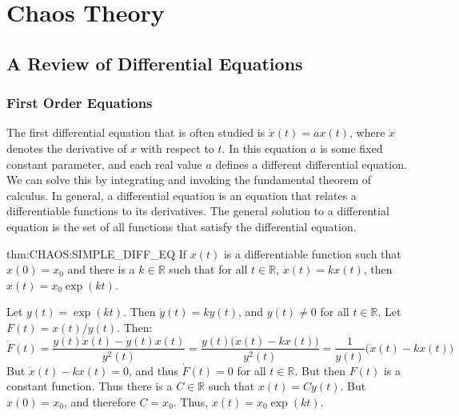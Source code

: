 \chapter{Chaos Theory}
    \section{A Review of Differential Equations}
        \subsection{First Order Equations}
            The first differential equation that is often studied
            is $\dot{x}(t)=ax(t)$, where $\dot{x}$ denotes the
            derivative of $x$ with respect to $t$. In this equation
            $a$ is some fixed constant parameter, and each real
            value $a$ defines a different differential equation.
            We can solve this by integrating and invoking the
            fundamental theorem of calculus. In general, a
            differential equation is an equation that relates
            a differentiable functions to its derivatives.
            The general solution to a differential equation is
            the set of all functions that satisfy the
            differential equation.
            \begin{ftheorem}{}{thm:CHAOS:SIMPLE_DIFF_EQ}
                If $x(t)$ is a differentiable function such
                that $x(0)=x_{0}$ and there is a $k\in\mathbb{R}$
                such that for all $t\in\mathbb{R}$, $\dot{x}(t)=kx(t)$,
                then $x(t)=x_{0}\exp(kt)$.
            \end{ftheorem}
            \begin{bproof}
                Let $y(t)=\exp(kt)$. Then $\dot{y}(t)=ky(t)$,
                and $y(t)\ne{0}$ for all $t\in\mathbb{R}$.
                Let $F(t)=x(t)/y(t)$. Then:
                \begin{equation*}
                    \dot{F}(t)=
                    \frac{y(t)\dot{x}(t)-\dot{y}(t)x(t)}{y^{2}(t)}
                    =\frac{y(t)\big(\dot{x}(t)-kx(t)\big)}{y^{2}(t)}
                    =\frac{1}{y(t)}\big(\dot{x}(t)-kx(t)\big)
                \end{equation*}
                But $\dot{x}(t)-kx(t)=0$, and thus $\dot{F}(t)=0$ for
                all $t\in\mathbb{R}$. But then $F(t)$ is a constant
                function. Thus there is a $C\in\mathbb{R}$ such
                that $x(t)=Cy(t)$. But $x(0)=x_{0}$, and therefore
                $C=x_{0}$. Thus, $x(t)=x_{0}\exp(kt)$.
            \end{bproof}
